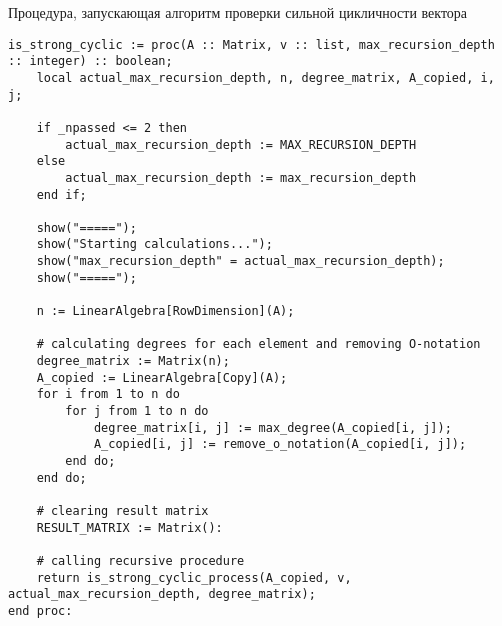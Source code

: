 \medskip
Процедура, запускающая алгоритм проверки сильной цикличности вектора
\begin{lstlisting}[basicstyle=\scriptsize]
is_strong_cyclic := proc(A :: Matrix, v :: list, max_recursion_depth :: integer) :: boolean;
    local actual_max_recursion_depth, n, degree_matrix, A_copied, i, j;
    
    if _npassed <= 2 then
        actual_max_recursion_depth := MAX_RECURSION_DEPTH
    else
        actual_max_recursion_depth := max_recursion_depth
    end if;
    
    show("=====");
    show("Starting calculations...");
    show("max_recursion_depth" = actual_max_recursion_depth);
    show("=====");
    
    n := LinearAlgebra[RowDimension](A);
    
    # calculating degrees for each element and removing O-notation
    degree_matrix := Matrix(n);
    A_copied := LinearAlgebra[Copy](A);
    for i from 1 to n do
        for j from 1 to n do
            degree_matrix[i, j] := max_degree(A_copied[i, j]);
            A_copied[i, j] := remove_o_notation(A_copied[i, j]);
        end do;
    end do;
    
    # clearing result matrix
    RESULT_MATRIX := Matrix():
    
    # calling recursive procedure
    return is_strong_cyclic_process(A_copied, v, actual_max_recursion_depth, degree_matrix);
end proc:
\end{lstlisting}


